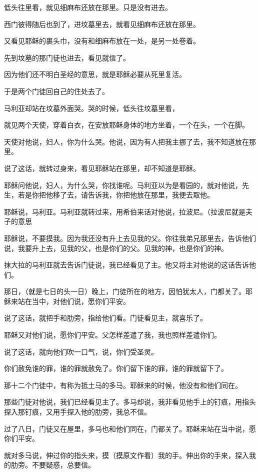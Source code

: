 \documentclass[12pt,oneside]{book}
\begin{document}
低头往里看，就见细麻布还放在那里。只是没有进去。

西门彼得随后也到了，进坟墓里去，就看见细麻布还放在那里。

又看见耶稣的裹头巾，没有和细麻布放在一处，是另一处卷着。

先到坟墓的那门徒也进去，看见就信了。

因为他们还不明白圣经的意思，就是耶稣必要从死里复活。

于是两个门徒回自己的住处去了。

马利亚却站在坟墓外面哭。哭的时候，低头往坟墓里看，

就见两个天使，穿着白衣，在安放耶稣身体的地方坐着，一个在头，一个在脚。

天使对他说，妇人，你为什么哭。他说，因为有人把我主挪了去，我不知道放在那里。

说了这话，就转过身来，看见耶稣站在那里，却不知道是耶稣。

耶稣问他说，妇人，为什么哭，你找谁呢。马利亚以为是看园的，就对他说，先生，若是你把他移了去，请告诉我，你把他放在那里，我便去取他。

耶稣说，马利亚。马利亚就转过来，用希伯来话对他说，拉波尼。（拉波尼就是夫子的意思

耶稣说，不要摸我。因为我还没有升上去见我的父。你往我弟兄那里去，告诉他们说，我要升上去，见我的父，也是你们的父。见我的神，也是你们的神。

抹大拉的马利亚就去告诉门徒说，我已经看见了主。他又将主对他说的这话告诉他们。

那日，（就是七日的头一日）晚上，门徒所在的地方，因怕犹太人，门都关了。耶稣来站在当中，对他们说，愿你们平安。

说了这话，就把手和肋旁，指给他们看。门徒看见主，就喜乐了。

耶稣又对他们说，愿你们平安。父怎样差遣了我，我也照样差遣你们。

说了这话，就向他们吹一口气，说，你们受圣灵。

你们赦免谁的罪，谁的罪就赦免了。你们留下谁的罪，谁的罪就留下了。

那十二个门徒中，有称为抵土马的多马。耶稣来的时候，他没有和他们同在。

那些门徒对他说，我们已经看见主了。多马却说，我非看见他手上的钉痕，用指头探入那钉痕，又用手探入他的肋旁，我总不信。

过了八日，门徒又在屋里，多马也和他们同在，门都关了。耶稣来站在当中说，愿你们平安。

就对多马说，伸过你的指头来，摸（摸原文作看）我的手。伸出你的手来，探入我的肋旁。不要疑惑，总要信。
\end{document}
